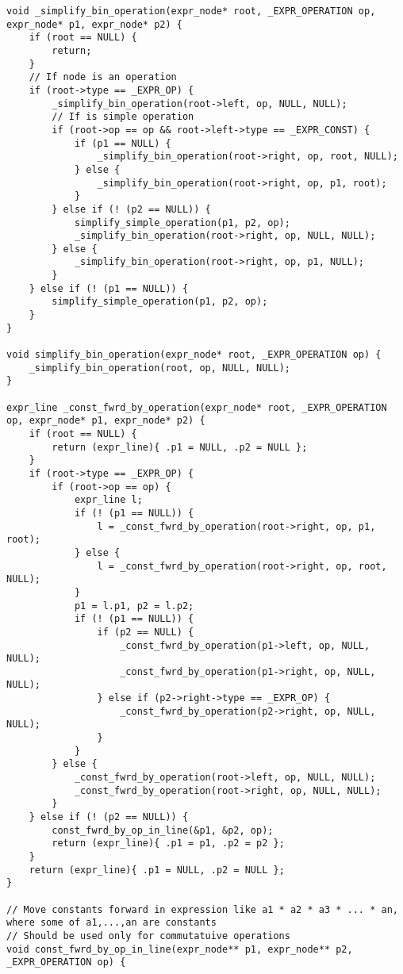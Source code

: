 \documentclass[a4paper]{article}
\newcounter{i}
\begin{document}
\begin{enumerate}[label=\textbf{\arabic*}.]
\begin{verbatim}
void _simplify_bin_operation(expr_node* root, _EXPR_OPERATION op, expr_node* p1, expr_node* p2) {
    if (root == NULL) {
        return;
    }
    // If node is an operation
    if (root->type == _EXPR_OP) {
        _simplify_bin_operation(root->left, op, NULL, NULL);
        // If is simple operation
        if (root->op == op && root->left->type == _EXPR_CONST) {
            if (p1 == NULL) {
                _simplify_bin_operation(root->right, op, root, NULL);
            } else {
                _simplify_bin_operation(root->right, op, p1, root);
            }
        } else if (! (p2 == NULL)) {
            simplify_simple_operation(p1, p2, op);
            _simplify_bin_operation(root->right, op, NULL, NULL);
        } else {
            _simplify_bin_operation(root->right, op, p1, NULL);
        }
    } else if (! (p1 == NULL)) {
        simplify_simple_operation(p1, p2, op);
    }
}

void simplify_bin_operation(expr_node* root, _EXPR_OPERATION op) {
    _simplify_bin_operation(root, op, NULL, NULL);
}

expr_line _const_fwrd_by_operation(expr_node* root, _EXPR_OPERATION op, expr_node* p1, expr_node* p2) {
    if (root == NULL) {
        return (expr_line){ .p1 = NULL, .p2 = NULL };
    }
    if (root->type == _EXPR_OP) {
        if (root->op == op) {
            expr_line l;
            if (! (p1 == NULL)) {
                l = _const_fwrd_by_operation(root->right, op, p1, root);
            } else {
                l = _const_fwrd_by_operation(root->right, op, root, NULL);            
            }
            p1 = l.p1, p2 = l.p2;
            if (! (p1 == NULL)) {
                if (p2 == NULL) {
                    _const_fwrd_by_operation(p1->left, op, NULL, NULL);
                    _const_fwrd_by_operation(p1->right, op, NULL, NULL);
                } else if (p2->right->type == _EXPR_OP) {
                    _const_fwrd_by_operation(p2->right, op, NULL, NULL);
                }
            }        
        } else {
            _const_fwrd_by_operation(root->left, op, NULL, NULL);
            _const_fwrd_by_operation(root->right, op, NULL, NULL);
        }
    } else if (! (p2 == NULL)) {
        const_fwrd_by_op_in_line(&p1, &p2, op);
        return (expr_line){ .p1 = p1, .p2 = p2 };
    }
    return (expr_line){ .p1 = NULL, .p2 = NULL };
}

// Move constants forward in expression like a1 * a2 * a3 * ... * an, where some of a1,...,an are constants
// Should be used only for commutatuive operations
void const_fwrd_by_op_in_line(expr_node** p1, expr_node** p2, _EXPR_OPERATION op) {


\end{verbatim}
\end{enumerate}
\end{document}
